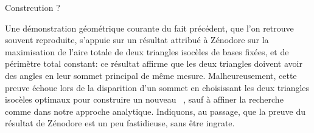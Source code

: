 \begin{remark}
	Constrcution ?
\end{remark}


\begin{remark}
	Une démonstration géométrique courante du fait précédent, que l'on retrouve souvent reproduite, s'appuie sur un résultat attribué à Zénodore sur la maximisation de l'aire totale de deux triangles isocèles de bases fixées, et de périmètre total constant:
	ce résultat affirme que les deux triangles doivent avoir des angles en leur sommet principal de même mesure.
	Malheureusement, cette preuve échoue lors de la disparition d'un sommet en choisissant les deux triangles isocèles optimaux pour construire un nouveau \ngone\ , sauf à affiner la recherche comme dans notre approche analytique.
	Indiquons, au passage, que la preuve du résultat de Zénodore est un peu fastidieuse, sans être ingrate.
\end{remark}
%	
%
%
%


